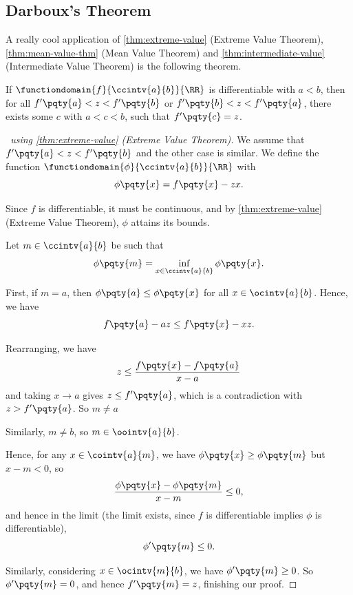 \subsection{Darboux's Theorem}

A really cool application of \autoref{thm:extreme-value} (Extreme Value Theorem), \autoref{thm:mean-value-thm} (Mean Value Theorem) and \autoref{thm:intermediate-value} (Intermediate Value Theorem) is the following theorem.

\begin{theorem}
    If \(\functiondomain{f}{\ccintv{a}{b}}{\RR}\) is differentiable with \(a < b\), then for all \(f'\pqty{a} < z < f'\pqty{b}\) or \(f'\pqty{b} < z < f'\pqty{a}\), there exists some \(c\) with \(a < c < b\), such that \(f'\pqty{c} = z\).
\end{theorem}

\begin{proof}[\proofname\ using \autoref{thm:extreme-value} (Extreme Value Theorem)]
    We assume that \(f'\pqty{a} < z < f'\pqty{b}\) and the other case is similar. We define the function \(\functiondomain{\phi}{\ccintv{a}{b}}{\RR}\) with
    \[
        \phi\pqty{x} = f\pqty{x} - zx.
    \]

    Since \(f\) is differentiable, it must be continuous, and by \autoref{thm:extreme-value} (Extreme Value Theorem), \(\phi\) attains its bounds.

    Let \(m \in \ccintv{a}{b}\) be such that
    \[
        \phi\pqty{m} = \inf_{x \in \ccintv{a}{b}} \phi\pqty{x}.
    \]

    First, if \(m = a\), then \(\phi\pqty{a} \leq \phi\pqty{x}\) for all \(x \in \ocintv{a}{b}\). Hence, we have
    \[
        f\pqty{a} - az \leq f\pqty{x} - xz.
    \]

    Rearranging, we have
    \[
        z \leq \frac{f\pqty{x} - f\pqty{a}}{x - a}
    \]
    and taking \(x \to a\) gives \(z \leq f'\pqty{a}\), which is a contradiction with \(z > f'\pqty{a}\). So \(m \neq a\)

    Similarly, \(m \neq b\), so \(m \in \oointv{a}{b}\).

    Hence, for any \(x \in \cointv{a}{m}\), we have \(\phi\pqty{x} \geq \phi\pqty{m}\) but \(x - m < 0\), so
    \[
        \frac{\phi\pqty{x} - \phi\pqty{m}}{x - m} \leq 0,
    \]
    and hence in the limit (the limit exists, since \(f\) is differentiable implies \(\phi\) is differentiable),
    \[
        \phi'\pqty{m} \leq 0.
    \]

    Similarly, considering \(x \in \ocintv{m}{b}\), we have \(\phi'\pqty{m} \geq 0\). So \(\phi'\pqty{m} = 0\), and hence \(f'\pqty{m} = z\), finishing our proof.
\end{proof}

